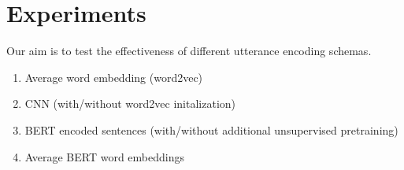 \documentclass[11pt,a4paper]{article}
\begin{document}
\section{Experiments}
Our aim is to test the effectiveness of different utterance encoding schemas. 
\begin{enumerate}
  \item Average word embedding (word2vec)
  \item CNN (with/without word2vec initalization)
  \item BERT encoded sentences (with/without additional unsupervised pretraining)
  \item Average BERT word embeddings
\end{enumerate}

{}

\end{document}
